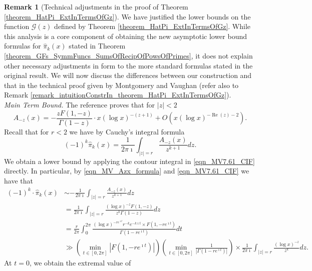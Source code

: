 \documentclass[11pt,reqno,a4letter]{article}
\numberwithin{figure}{section}
\numberwithin{table}{section}
\theoremstyle{plain}
\numberwithin{theorem}{section}
\theoremstyle{definition}
\newtheorem{remark}[theorem]{Remark}
\renewcommand{\Re}{\operatorname{Re}}
\begin{document}
\begin{remark}[Technical adjustments in the proof of Theorem \ref{theorem_HatPi_ExtInTermsOfGz}]
We have justified the lower bounds on the function $\mathcal{G}(z)$ defined by 
Theorem \ref{theorem_HatPi_ExtInTermsOfGz}. 
While this analysis is a core component of obtaining the new asymptotic 
lower bound formulas for $\widehat{\pi}_k(x)$ stated in 
Theorem \ref{theorem_GFs_SymmFuncs_SumsOfRecipOfPowsOfPrimes}, 
it does not explain other necessary adjustments in form to the more 
standard formulas stated in the original result. 
We will now discuss the differences between our construction and that in 
the technical proof given by Montgomery and Vaughan 
(refer also to Remark \ref{remark_intuitionConstrIn_theorem_HatPi_ExtInTermsOfGz}). \\ 
\textit{Main Term Bound.} 
The reference proves that for $|z| < 2$ 
\begin{equation} 
\label{eqn_MV_Azx_formula} 
A_{-z}(x) = -\frac{z F(1, -z)}{\Gamma(1-z)} \cdot x (\log x)^{-(z+1)} + 
     O\left(x (\log x)^{-\Re(z) - 2}\right). 
\end{equation}
Recall that for $r < 2$ we have by Cauchy's integral formula 
\begin{equation} 
\label{eqn_MV7.61_CIF} 
(-1)^{k} \widehat{\pi}_k(x) = \frac{1}{2\pi\imath} \int_{|z|=r} 
     \frac{A_{-z}(x)}{z^{k+1}} dz. 
\end{equation} 
We obtain a lower bound by applying the contour integral 
in \eqref{eqn_MV7.61_CIF} directly. In particular, by 
\eqref{eqn_MV_Azx_formula} and 
\eqref{eqn_MV7.61_CIF} we have that 
\begin{align*} 
(-1)^k \cdot \widehat{\pi}_k(x) & \sim -\frac{1}{2\pi\imath} \int_{|z|=r} \frac{A_{-z}(x)}{z^{k+1}} dz \\ 
     & = \frac{1}{2\pi\imath} \int_{|z|=r} \frac{(\log x)^{-z} F(1, -z)}{z^k \Gamma(1-z)} dz \\ 
     & = \frac{r}{2\pi} \int_0^{2\pi} \frac{(\log x)^{-re^{\imath t}} r^{-k} e^{-k\imath t} \times 
     F\left(1, -re^{\imath t}\right)}{\Gamma\left(1-re^{\imath t}\right)} dt \\ 
     & \gg \left(\min\limits_{t \in [0, 2\pi]} \left\lvert 
     F\left(1, -re^{\imath t}\right) \right\rvert\right) 
     \left(\min\limits_{t \in [0, 2\pi]} \frac{1}{\left\lvert 
     \Gamma\left(1-re^{\imath t}\right) \right\rvert}\right) \times 
     \frac{1}{2\pi\imath} \int_{|z|=r} \frac{(\log x)^{-z}}{z^k} dz. 
\end{align*} 
At $t = 0$, we obtain the extremal value of 

\end{remark}
\end{document}
